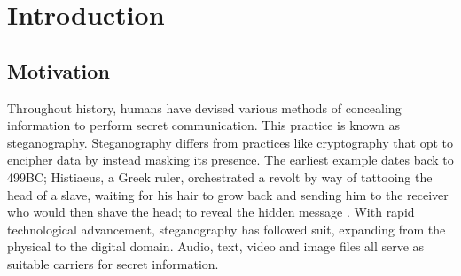 \documentclass{l4proj}
\begin{document}
%
%
%
%
%
%
%
%
\chapter{Introduction} \label{Introduction}


\section{Motivation}


Throughout history, humans have devised various methods of concealing information to perform secret communication. This practice is known as steganography. Steganography differs from practices like cryptography that opt to encipher data by instead masking its presence. The earliest example dates back to 499BC; Histiaeus, a Greek ruler, orchestrated a revolt by way of tattooing the head of a slave, waiting for his hair to grow back and sending him to the receiver who would then shave the head; to reveal the hidden message \citep{histiaeus}. With rapid technological advancement, steganography has followed suit, expanding from the physical to the digital domain. Audio, text, video and image files all serve as suitable carriers for secret information.
\end{document}
